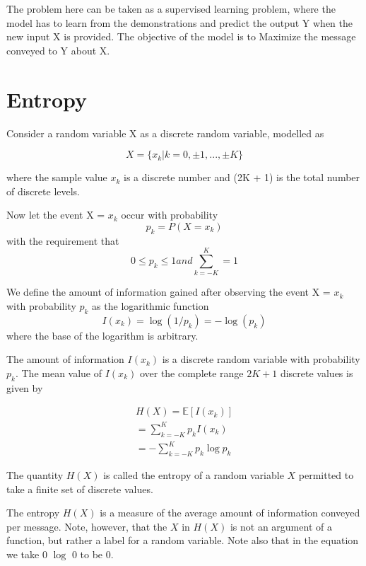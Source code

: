 \documentclass[11pt]{article}
\begin{document}
The problem here can be taken as a supervised learning problem, where the model has to learn from the demonstrations and predict the output Y when the new input X is provided. The objective of the model is to Maximize the message conveyed to Y about X. 

\section{Entropy}

Consider a random variable X as a discrete random variable, modelled as 

\begin{equation}
    X = \{x_k | k = 0, \pm 1, ..., \pm K\}
\end{equation}

where the sample value $x_k$ is a discrete number and (2K + 1) is the total number of discrete levels.

Now let the event X = $x_k$ occur with probability
\begin{equation}
	p_k = P(X = x_k)
\end{equation}
with the requirement that 
\begin{equation}
	0 \leq p_k \leq 1 and \sum _{k = -K}^{K} = 1
\end{equation}

We define the amount of information gained after observing the event X = $x_k$ with probability $p_k$ as the logarithmic function 
\begin{equation}
	I(x_k) = \log(1 / p_k) = -\log(p_k)
\end{equation}
where the base of the logarithm is arbitrary. 

The amount of information $I(x_k)$ is a discrete random variable with probability $p_k$. The mean value of $I(x_k)$ over the complete range $2K +1$ discrete values is given by

\begin{align*}
	H(X) = \mathbb{E}[I(x_k)] \\
	     = \sum _{k = -K}^{K}p_k I(x_k)\\
	     = - \sum _{k = -K}^{K} p_k \log p_k
\end{align*}

The quantity $H(X)$ is called the entropy of a random variable $X$ permitted to take a finite set of discrete values.

The entropy $H(X)$ is a measure of the average amount of information conveyed per message. Note, however, that the $X$ in $H(X)$  is not an argument of a function, but rather a label for a random variable. Note also that in the equation we take 0 $\log$ 0 to be 0.
\end{document}
